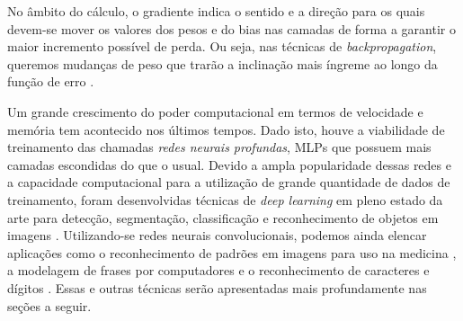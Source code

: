 No âmbito do cálculo, o gradiente indica o sentido e a direção para os quais devem-se mover os valores dos pesos e do bias nas camadas de forma a garantir o maior incremento possível de perda. Ou seja, nas técnicas de \emph{backpropagation}, queremos mudanças de peso que trarão a inclinação mais íngreme ao longo da função de erro \cite{goodfellow, kubat}.

Um grande crescimento do poder computacional em termos de velocidade e memória tem acontecido nos últimos tempos. Dado isto, houve a viabilidade de treinamento das chamadas \emph{redes neurais profundas}, MLPs que possuem mais camadas escondidas do que o usual. Devido a ampla popularidade dessas redes e a capacidade computacional para a utilização de grande quantidade de dados de treinamento, foram desenvolvidas técnicas de \emph{deep learning} em pleno estado da arte para detecção, segmentação, classificação e reconhecimento de objetos em imagens \cite{khan}. Utilizando-se redes neurais convolucionais, podemos ainda elencar aplicações como o reconhecimento de padrões em imagens para uso na medicina \cite{cha}, a modelagem de frases por computadores \cite{kalchbrenner} e o reconhecimento de caracteres e dígitos \cite{lecun}. Essas e outras técnicas serão apresentadas mais profundamente nas seções a seguir.


